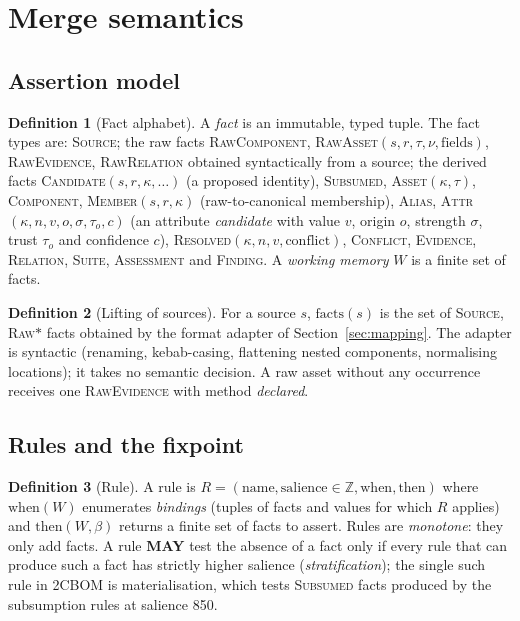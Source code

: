 \documentclass[11pt,a4paper]{article}
\newcommand{\twocbom}{2CBOM}
\newcommand{\MAY}{\textbf{MAY}}
\theoremstyle{definition}
\newtheorem{definition}{Definition}[section]
\theoremstyle{plain}
\begin{document}
\section{Merge semantics}\label{sec:merge}
\subsection{Assertion model}
\begin{definition}[Fact alphabet]
A \emph{fact} is an immutable, typed tuple. The fact types are: \textsc{Source}; the raw
facts \textsc{RawComponent}, \textsc{RawAsset}$(s, r, \tau, \nu, \text{fields})$,
\textsc{RawEvidence}, \textsc{RawRelation} obtained syntactically from a source; the derived
facts \textsc{Candidate}$(s, r, \kappa, \ldots)$ (a proposed identity), \textsc{Subsumed},
\textsc{Asset}$(\kappa,\tau)$, \textsc{Component}, \textsc{Member}$(s,r,\kappa)$ (raw-to-canonical
membership), \textsc{Alias}, \textsc{Attr}$(\kappa, n, v, o, \sigma, \tau_o, c)$ (an attribute
\emph{candidate} with value $v$, origin $o$, strength $\sigma$, trust $\tau_o$ and confidence
$c$), \textsc{Resolved}$(\kappa, n, v, \text{conflict})$, \textsc{Conflict}, \textsc{Evidence},
\textsc{Relation}, \textsc{Suite}, \textsc{Assessment} and \textsc{Finding}. A \emph{working
memory} $W$ is a finite set of facts.
\end{definition}

\begin{definition}[Lifting of sources]
For a source $s$, $\mathrm{facts}(s)$ is the set of \textsc{Source}, \textsc{Raw}$\ast$ facts
obtained by the format adapter of Section~\ref{sec:mapping}. The adapter is syntactic
(renaming, kebab-casing, flattening nested components, normalising locations); it takes no
semantic decision. A raw asset without any occurrence receives one \textsc{RawEvidence} with
method \emph{declared}.
\end{definition}

\subsection{Rules and the fixpoint}
\begin{definition}[Rule]
A rule is $R = (\text{name}, \text{salience} \in \mathbb{Z}, \text{when}, \text{then})$ where
$\text{when}(W)$ enumerates \emph{bindings} (tuples of facts and values for which $R$ applies)
and $\text{then}(W, \beta)$ returns a finite set of facts to assert. Rules are
\emph{monotone}: they only add facts. A rule \MAY{} test the absence of a fact only if every
rule that can produce such a fact has strictly higher salience (\emph{stratification}); the
single such rule in \twocbom{} is materialisation, which tests \textsc{Subsumed} facts produced
by the subsumption rules at salience 850.
\end{definition}
\end{document}
